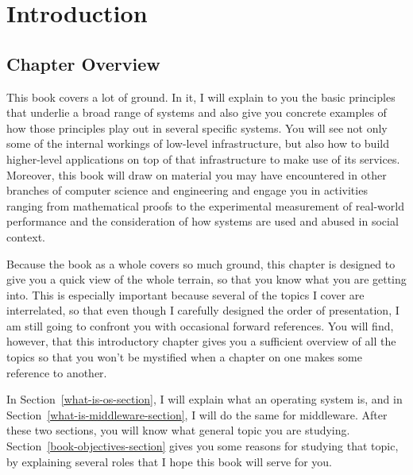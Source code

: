 \chapter{Introduction}\label{intro-chapter}

\section{Chapter Overview}

This book covers a lot of ground.  In it, I will explain to you the basic
principles that underlie a broad range of systems and also give you
concrete examples of how those principles play out in several specific
systems.  You will see not only some of the internal workings of
low-level infrastructure, but also how to build
higher-level applications on top of that infrastructure to make use of
its services.  Moreover, this book will draw on material you may have encountered in
other branches of computer science and engineering and engage you in
activities ranging from mathematical proofs to the experimental
measurement of real-world performance and the consideration of how
systems are used and abused in social context.

Because the book as a whole covers so much ground, this chapter is
designed to give you a quick view of the whole terrain, so that you
know what you are getting into.  This is especially important because
several of the topics I cover are interrelated, so that even though I
carefully designed the order of presentation, I am still going to confront
you with occasional forward references. You will find, however, that this introductory chapter
gives you a sufficient overview of all the topics so that you won't
be mystified when a chapter on one makes some reference to another.

In Section~\ref{what-is-os-section}, I will explain what an operating
system is, and in Section~\ref{what-is-middleware-section}, I will do
the same for middleware.  After these two sections, you will know
what general topic you are studying.
Section~\ref{book-objectives-section} gives you some reasons
for studying that topic, by explaining several roles that I hope this
book will serve for you.

